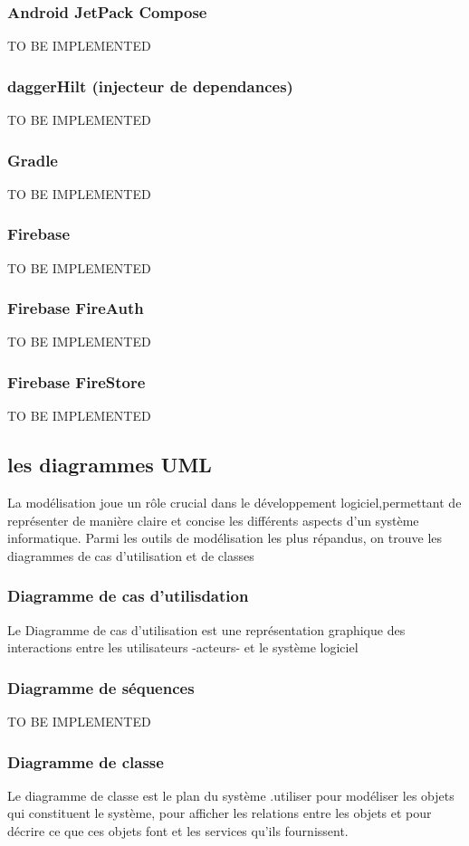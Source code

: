 \subsubsection{Android JetPack Compose}
TO BE IMPLEMENTED
\subsubsection{daggerHilt (injecteur de dependances)}
TO BE IMPLEMENTED
\subsubsection{Gradle}
TO BE IMPLEMENTED
\subsubsection{Firebase}
TO BE IMPLEMENTED
\subsubsection{Firebase FireAuth}
TO BE IMPLEMENTED
\subsubsection{Firebase FireStore}
TO BE IMPLEMENTED


\subsection{les diagrammes UML}
La modélisation  joue un rôle crucial  dans le développement logiciel,permettant de représenter de manière claire et concise les différents aspects d'un système informatique. 
Parmi les outils de modélisation les plus répandus, on trouve les diagrammes de cas d'utilisation et de classes
\newpage


\subsubsection{Diagramme de cas d'utilisdation}
Le  Diagramme de cas d'utilisation est une représentation graphique des interactions entre les utilisateurs -acteurs- et le système logiciel



\subsubsection{Diagramme de séquences}
TO BE IMPLEMENTED
\subsubsection{Diagramme de classe}
Le diagramme de classe est le plan du système .utiliser pour modéliser les objets qui constituent le système, pour afficher les relations entre les objets et pour décrire ce que ces objets font et les services qu'ils fournissent.
\cite{IBM:class}
